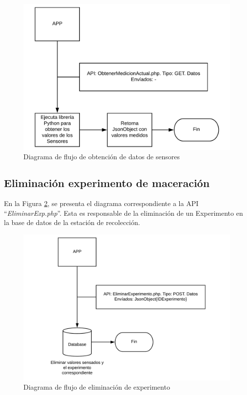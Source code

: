             \begin{figure}[htb]
                \centering
                \includegraphics[scale=0.5]{DiagramaGetTempPh.pdf}
                \caption{Diagrama de flujo de obtención de datos de sensores}
                \label{fig:ApiGetTempPh}
            \end{figure}
        
        \subsection{Eliminación experimento de maceración}
        \par En la Figura \ref{fig:ApiRemoveExp}, se presenta el diagrama correspondiente a la API ``\textit{EliminarExp.php}''. Esta es responsable de la eliminación de un Experimento en la base de datos de la estación de recolección.
            \begin{figure} [htb]
                \centering
                \includegraphics[scale=0.5]{DiagramaRemoveExp.pdf}
                \caption{Diagrama de flujo de eliminación de experimento}
                \label{fig:ApiRemoveExp}
            \end{figure}
            
